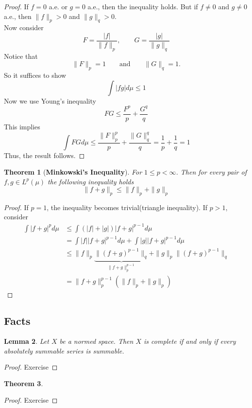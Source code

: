 \documentclass[	DIV=calc,paper=a4,fontsize=11pt]{scrartcl}	 	%
\newtheorem{thm}{Theorem}[section]
\newtheorem{lem}[thm]{Lemma}
\theoremstyle{definition}
\theoremstyle{plain}
\theoremstyle{remark}
\begin{document}
\begin{proof}
If $f=0$ a.e. or $g=0$ a.e., then the inequality holds. But if $f\neq 0$ and $g\neq 0$ a.e., then $\|f\|_p>0$ and $\|g\|_q>0$.\\
Now consider
\[F=\frac{|f|}{\|f\|_p},\qquad G=\frac{|g|}{\|g\|_q}\]
Notice that
\[\|F\|_p=1\qquad \mbox{and}\qquad \|G\|_q=1.\]
So it suffices to show
\[\int |fg|d\mu\leq 1\]
Now we use Young's inequality
\[FG\leq \frac{F^p}{p}+\frac{G^q}{q}\]
This implies
\[\int FG d\mu\leq \frac{\|F\|_p^p}{p}+\frac{\|G\|_q^q}{q}=\frac{1}{p}+\frac{1}{q}=1\]
Thus, the result follows.
\end{proof}

\begin{thm}[\textbf{Minkowski's Inequality}]
For $1\leq p<\infty$. Then for every pair of $f,g\in L^p(\mu)$ the following inequality holds
\[\|f+g\|_p\leq \|f\|_p+\|g\|_p\]
\end{thm}

\begin{proof}
If $p=1$, the inequality becomes trivial(triangle inequality). If $p>1$, consider
\begin{align*}
\int |f+g|^pd\mu &\leq \int (|f|+|g|)|f+g|^{p-1}d\mu\\
                 &=\int |f||f+g|^{p-1}d\mu+\int |g||f+g|^{p-1}d\mu\\
                 &\leq \|f\|_p\underbrace{\|(f+g)^{p-1}\|_q}_{\|f+g\|_p^{p-1}}+\|g\|_p\|(f+g)^{p-1}\|_q\tag{Holder}\\
                 &=\|f+g\|_p^{p-1}(\|f\|_p+\|g\|_p)
\end{align*}

\end{proof}

\subsection{Facts}

\begin{lem}
Let $X$ be a normed space. Then $X$ is complete if and only if every absolutely summable series is summable.
\end{lem}

\begin{proof}
Exercise
\end{proof}


\begin{thm}

\end{thm}

\begin{proof}
Exercise
\end{proof}
\end{document}
